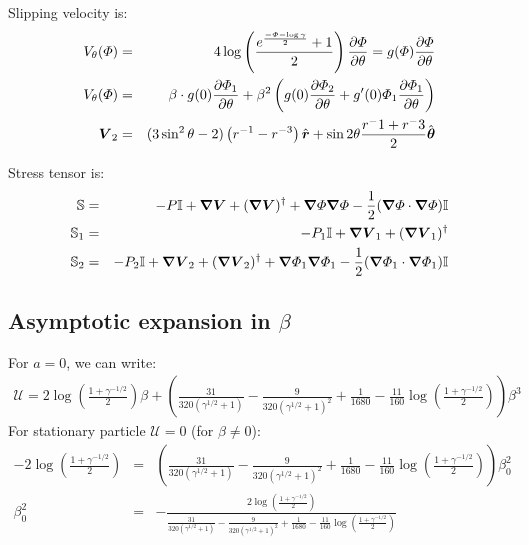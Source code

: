 Slipping velocity is:
\begin{eqnarray}
V_\theta(\varPhi) &=& 4\log\left(\frac{e^\frac{-\varPhi-\log\gamma}{2}+1}{2}\right)\frac{\partial \varPhi}{\partial \theta} 
= g(\varPhi) \frac{\partial \varPhi}{\partial \theta} 
\\
V_\theta(\varPhi) &=& \beta \cdot g(0) \frac{\partial \varPhi_1}{\partial \theta} +
\beta^2 \left(g(0) \frac{\partial \varPhi_2}{\partial \theta} + g'(0) \varPhi_1 \frac{\partial \varPhi_1}{\partial \theta}\right)
\\
\boldsymbol{V}_2 &=& (3\sin^2\theta - 2)\left(r^{-1} - r^{-3}\right) \hat{\boldsymbol{r}} + \sin2\theta\frac{r^-1+r^-3}{2}\hat{\boldsymbol{\theta}}
\end{eqnarray}

Stress tensor is:
\begin{eqnarray}
  \mathbb{S} &=& -P \mathbb{I} + \boldsymbol{\nabla} \boldsymbol{V} + (\boldsymbol{\nabla} \boldsymbol{V})^\dagger +
  \boldsymbol{\nabla} \varPhi \boldsymbol{\nabla} \varPhi - \frac{1}{2} (\boldsymbol{\nabla} \varPhi \cdot \boldsymbol{\nabla} \varPhi) \mathbb{I}
  \\
  \mathbb{S}_1 &=& -P_1 \mathbb{I} + \boldsymbol{\nabla} \boldsymbol{V}_1 + (\boldsymbol{\nabla} \boldsymbol{V}_1)^\dagger
  \\
  \mathbb{S}_2 &=& -P_2 \mathbb{I} + \boldsymbol{\nabla} \boldsymbol{V}_2 + (\boldsymbol{\nabla} \boldsymbol{V}_2)^\dagger + \boldsymbol{\nabla} \varPhi_1 \boldsymbol{\nabla} \varPhi_1 - \frac{1}{2} (\boldsymbol{\nabla} \varPhi_1 \cdot \boldsymbol{\nabla} \varPhi_1) \mathbb{I}
\end{eqnarray} 

\subsection{Asymptotic expansion in $\beta$}
For $a=0$, we can write:
\begin{eqnarray}
\mathcal{U} = 2\log\left(\frac{1+\gamma^{-1/2}}{2}\right)\beta 
       + \left(\frac{31}{320\left(\gamma^{1/2}+1\right)} 
       - \frac{9}{320\left(\gamma^{1/2}+1\right)^2}  + \frac{1}{1680}
       - \frac{11}{160}\log\left(\frac{1+\gamma^{-1/2}}{2}\right)\right)\beta^3
\end{eqnarray}
For stationary particle $\mathcal{U} = 0$ (for $\beta \ne 0$):
\begin{eqnarray}
-2\log\left(\frac{1+\gamma^{-1/2}}{2}\right) &=& 
       \left(\frac{31}{320\left(\gamma^{1/2}+1\right)} 
       - \frac{9}{320\left(\gamma^{1/2}+1\right)^2}  + \frac{1}{1680}
       - \frac{11}{160}\log\left(\frac{1+\gamma^{-1/2}}{2}\right)\right)\beta^2_0 \\
\beta_0^2 &=& -\frac{2\log\left(\frac{1+\gamma^{-1/2}}{2}\right)}{
\frac{31}{320\left(\gamma^{1/2}+1\right)} 
       - \frac{9}{320\left(\gamma^{1/2}+1\right)^2}  + \frac{1}{1680}
       - \frac{11}{160}\log\left(\frac{1+\gamma^{-1/2}}{2}\right)}
\end{eqnarray}
